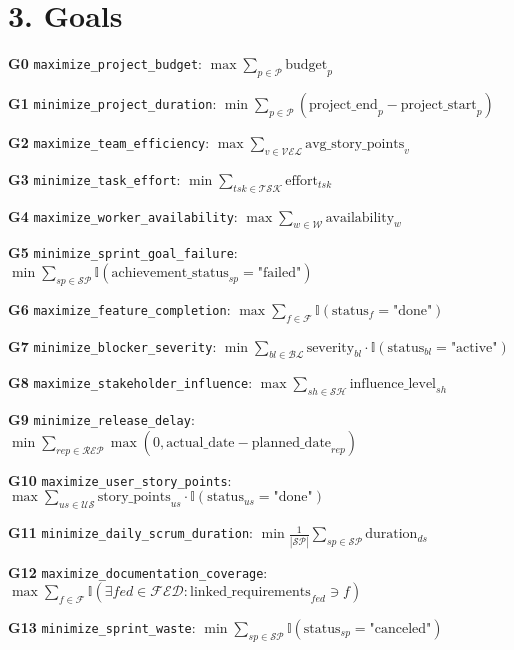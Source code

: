\documentclass[12pt]{article}
\begin{document}
\section{3. Goals}
\item[\textbf{G0}] \texttt{maximize\_project\_budget}: 
    $ \max \sum_{p \in \mathcal{P}} \text{budget}_p $ 
    \item[\textbf{G1}] \texttt{minimize\_project\_duration}: 
    $ \min \sum_{p \in \mathcal{P}} (\text{project\_end}_p - \text{project\_start}_p) $
    \item[\textbf{G2}] \texttt{maximize\_team\_efficiency}: 
    $ \max \sum_{v \in \mathcal{VEL}} \text{avg\_story\_points}_v $
    \item[\textbf{G3}] \texttt{minimize\_task\_effort}: 
    $ \min \sum_{tsk \in \mathcal{TSK}} \text{effort}_{tsk} $
    \item[\textbf{G4}] \texttt{maximize\_worker\_availability}: 
    $ \max \sum_{w \in \mathcal{W}} \text{availability}_w $
    \item[\textbf{G5}] \texttt{minimize\_sprint\_goal\_failure}: 
    $ \min \sum_{sp \in \mathcal{SP}} \mathbb{I}(\text{achievement\_status}_{sp} = \text{"failed"}) $
    \item[\textbf{G6}] \texttt{maximize\_feature\_completion}: 
    $ \max \sum_{f \in \mathcal{F}} \mathbb{I}(\text{status}_f = \text{"done"}) $
    \item[\textbf{G7}] \texttt{minimize\_blocker\_severity}: 
    $ \min \sum_{bl \in \mathcal{BL}} \text{severity}_{bl} \cdot \mathbb{I}(\text{status}_{bl} = \text{"active"}) $
    \item[\textbf{G8}] \texttt{maximize\_stakeholder\_influence}: 
    $ \max \sum_{sh \in \mathcal{SH}} \text{influence\_level}_{sh} $
    \item[\textbf{G9}] \texttt{minimize\_release\_delay}: 
    $ \min \sum_{rep \in \mathcal{REP}} \max(0, \text{actual\_date} - \text{planned\_date}_{rep}) $
    \item[\textbf{G10}] \texttt{maximize\_user\_story\_points}: 
    $ \max \sum_{us \in \mathcal{US}} \text{story\_points}_{us} \cdot \mathbb{I}(\text{status}_{us} = \text{"done"}) $
    \item[\textbf{G11}] \texttt{minimize\_daily\_scrum\_duration}: 
    $ \min \frac{1}{|\mathcal{SP}|} \sum_{sp \in \mathcal{SP}} \text{duration}_{ds} $
    \item[\textbf{G12}] \texttt{maximize\_documentation\_coverage}: 
    $ \max \sum_{f \in \mathcal{F}} \mathbb{I}(\exists fed \in \mathcal{FED}: \text{linked\_requirements}_{fed} \ni f) $
    \item[\textbf{G13}] \texttt{minimize\_sprint\_waste}: 
    $ \min \sum_{sp \in \mathcal{SP}} \mathbb{I}(\text{status}_{sp} = \text{"canceled"}) $
\end{document}
